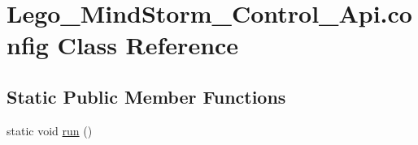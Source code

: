 \hypertarget{class_lego___mind_storm___control___api_1_1config}{
\section{Lego\_\-MindStorm\_\-Control\_\-Api.config Class Reference}
\label{class_lego___mind_storm___control___api_1_1config}
}
\subsection*{Static Public Member Functions}
\begin{CompactItemize}
\item 
static void \hyperlink{class_lego___mind_storm___control___api_1_1config_951058cc9f3239469c02a597fcaabbc1}{run} ()
\end{CompactItemize}
